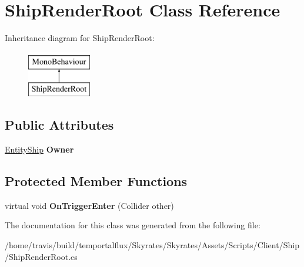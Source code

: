 \hypertarget{class_ship_render_root}{\section{Ship\-Render\-Root Class Reference}
\label{class_ship_render_root}
}
Inheritance diagram for Ship\-Render\-Root\-:\begin{figure}[H]
\begin{center}
\leavevmode
\includegraphics[height=2.000000cm]{class_ship_render_root}
\end{center}
\end{figure}
\subsection*{Public Attributes}
\begin{DoxyCompactItemize}
\item 
\hypertarget{class_ship_render_root_a7178f622fe6b018faa2611f53e42193a}{\hyperlink{class_skyrates_1_1_client_1_1_entity_1_1_entity_ship}{Entity\-Ship} {\bfseries Owner}}\label{class_ship_render_root_a7178f622fe6b018faa2611f53e42193a}

\end{DoxyCompactItemize}
\subsection*{Protected Member Functions}
\begin{DoxyCompactItemize}
\item 
\hypertarget{class_ship_render_root_a5d12b0376667dda444bb945cc333e643}{virtual void {\bfseries On\-Trigger\-Enter} (Collider other)}\label{class_ship_render_root_a5d12b0376667dda444bb945cc333e643}

\end{DoxyCompactItemize}


The documentation for this class was generated from the following file\-:\begin{DoxyCompactItemize}
\item 
/home/travis/build/temportalflux/\-Skyrates/\-Skyrates/\-Assets/\-Scripts/\-Client/\-Ship/Ship\-Render\-Root.\-cs\end{DoxyCompactItemize}
